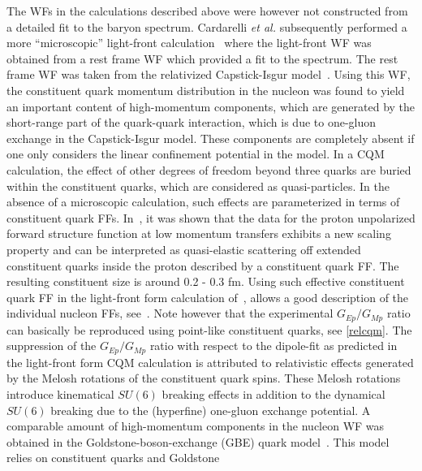 
The WFs in the calculations described above were however not 
constructed from a detailed fit to the baryon spectrum. 
Cardarelli {\it et al.}  
subsequently performed a more ``microscopic'' light-front 
calculation~\cite{rome,cardarelli} 
where the light-front WF was obtained from a rest frame WF 
which provided a fit to the spectrum. 
The rest frame WF was taken from 
the relativized Capstick-Isgur model~\cite{Capstick:1986bm}.  
Using this WF, 
the constituent quark momentum distribution in the nucleon 
was found to yield an important content 
of high-momentum components, which are generated by the short-range 
part of the quark-quark interaction, which is due to one-gluon exchange in 
the Capstick-Isgur model. These components are completely absent if one only 
considers the linear confinement potential in the model. 
\newline
\indent
In a CQM calculation,  
the effect of other degrees of freedom beyond three quarks are 
buried within the constituent quarks, which are considered as quasi-particles. 
In the absence of a microscopic calculation, 
such effects are parameterized in terms of constituent quark FFs. 
In~\cite{Petronzio:2003bw}, 
it was shown that the data for the proton unpolarized forward 
structure function at low momentum transfers exhibits a new scaling 
property and can be interpreted as quasi-elastic scattering off extended 
constituent quarks inside the proton described by a 
constituent quark FF. The resulting constituent size is 
around 0.2 - 0.3 fm. 
Using such effective constituent quark FF in 
the light-front form calculation of~\cite{cardarelli}, 
allows a good description of the individual nucleon FFs, see~\cite{pace}.
Note however that the experimental $G_{Ep} / G_{Mp}$ ratio 
can basically be reproduced using point-like constituent quarks, 
see \ref{relcqm}. 
The suppression of the $G_{Ep}/G_{Mp}$ 
ratio with respect to the dipole-fit as predicted 
in the light-front form CQM calculation is 
attributed to relativistic effects generated by the Melosh rotations of the 
constituent quark spins. These Melosh rotations introduce kinematical 
$SU(6)$ breaking effects in addition to the dynamical 
$SU(6)$ breaking due to the (hyperfine) one-gluon exchange potential. 
\newline
\indent
A comparable amount of high-momentum components in the nucleon 
WF was obtained in the 
Goldstone-boson-exchange (GBE) 
quark model~\cite{Glozman:1997fs,Glozman:1997ag}.  
This model relies on constituent quarks and Goldstone 
